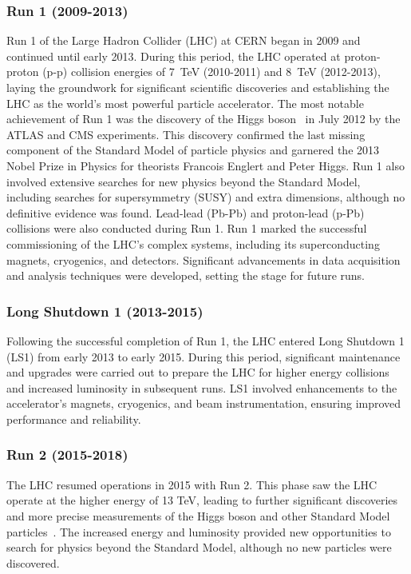         \subsubsection{Run 1 (2009-2013)}
            Run 1 of the Large Hadron Collider (LHC) at CERN began in 2009 and continued until early 2013. 
            During this period, the LHC operated at proton-proton (p-p) collision energies of 7~TeV (2010-2011) and 8~TeV (2012-2013), 
            laying the groundwork for significant scientific discoveries and establishing the LHC as 
            the world's most powerful particle accelerator. The most notable achievement of Run 1 was the 
            discovery of the Higgs boson~\cite{HIGG-2012-27,CMS-HIG-12-028} in July 2012 by the ATLAS and CMS experiments. This discovery confirmed 
            the last missing component of the Standard Model of particle physics and garnered the 2013 Nobel 
            Prize in Physics for theorists Francois Englert and Peter Higgs. Run 1 also involved extensive searches 
            for new physics beyond the Standard Model, including searches for supersymmetry (SUSY) and extra 
            dimensions, although no definitive evidence was found.
            Lead-lead (Pb-Pb) and proton-lead (p-Pb) collisions were also conducted during Run 1. 
            Run 1 marked the successful commissioning of the LHC's complex systems, including its superconducting magnets, cryogenics, and detectors.
            Significant advancements in data acquisition and analysis techniques were developed, setting the stage for future runs.
        \subsubsection{Long Shutdown 1 (2013-2015)}
            Following the successful completion of Run 1, the LHC entered Long Shutdown 1 (LS1) from early 2013 to early 2015. During this period, 
            significant maintenance and upgrades were carried out to prepare the LHC for higher energy collisions and increased luminosity in 
            subsequent runs. LS1 involved enhancements to the accelerator's magnets, cryogenics, and beam instrumentation, ensuring improved 
            performance and reliability.
        \subsubsection{Run 2 (2015-2018)}
            The LHC resumed operations in 2015 with Run 2. 
            This phase saw the LHC operate at the higher energy of 13 TeV, leading to further significant discoveries 
            and more precise measurements of the Higgs boson and other Standard Model particles~\cite{ParticleDataGroup:2022pth}. 
            The increased energy 
            and luminosity provided new opportunities to search for physics beyond the Standard Model, although no 
            new particles were discovered.
